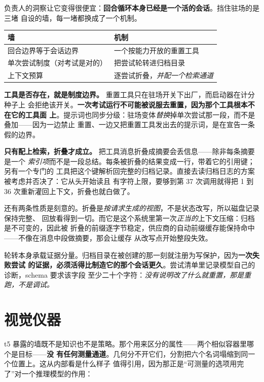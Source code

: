 \documentclass[11pt,a4paper,UTF8,fontset=macnew]{ctexrep}
\newcommand{\keyrule}[1]{\textbf{\textcolor{acc}{#1}}}
\begin{document}
负责人的洞察让它变得很便宜：\textbf{回合循环本身已经是一个活的会话}。挡住驻场的是三堵
自设的墙，每一堵都换成了一个机制。

\begin{table}[htbp]
\centering\small
\begin{tabularx}{\textwidth}{@{}X X@{}}
\toprule
\textbf{墙} & \textbf{机制} \\
\midrule
回合边界等于会话边界 & 一个按能力开放的重置工具 \\
单次尝试制度（对考试是对的） & 把尝试轮转进归档目录 \\
上下文预算 & 逐尝试折叠，\emph{并配一个检索通道} \\
\bottomrule
\end{tabularx}
\end{table}

\keyrule{工具是否存在，就是制度边界。} 重置工具只在驻场开关下出厂，而启动器在计分种子上
会拒绝该开关。\textbf{一次考试运行不可能被说服去重置，因为那个工具根本不在它的工具面
上}。提示词也同步分级：驻场变体\emph{替换}掉单次尝试那一段，而不是叠加——因为一边禁止
重置、一边又把重置工具发出去的提示词，是在宣告一条假的边界。

\keyrule{只有配上检索，折叠才成立。} 把工具消息折叠成摘要会丢信息——除非每条摘要是一个
\emph{索引项}而不是一段总结。每条被折叠的结果变成一行，带着它的引用键；另有一个专门的
工具把这个键解析回完整的归档记录。直接去读归档日志的方案被考虑并否决了：它从头开始读且
有字符上限，要够到第 37 次调用就得把 1 到 36 次重新灌回上下文，折叠也就白做了。

还有两条性质是刻意的。折叠是\emph{按请求生成的视图}，不是状态改写，所以磁盘记录保持完整、
回放看得到一切。而它是这个系统里第一次\emph{正当的}上下文压缩：归档是不可变的，因此被
折叠的前缀逐字节稳定，供应商的自动前缀缓存能保持命中——不像在消息中段做摘要，那会让缓存
从改写点开始整段失效。

轮转本身承载证据分量。归档目录在被创建的那一刻就注册为写保护，因为\textbf{一次失败尝试
的证据，必须活得比制造它的那个会话更久}。尝试清单里记录模型自己的诊断，schema 要求该字段
至少二十个字符：\emph{没有说明改了什么就重置，那是重跑，不是调试。}

\chapter{视觉仪器}

t5 暴露的墙既不是知识也不是策略。那个用来区分的属性——两个相似容器里哪个是目标——\textbf{没
有任何测量通道}。几何分不开它们，分割把六个名词塌缩到同一个位置上。这从内部看是什么样子
值得引用，因为那正是“可测量的选项用完了”对一个推理模型的作用：
\end{document}
